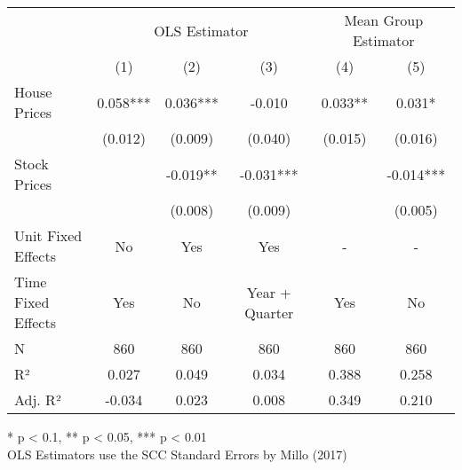 \begin{table}[h]
\fontsize{9.0pt}{10.8pt}\selectfont
\begin{tabular*}{\linewidth}{@{\extracolsep{\fill}}lccccc}
\toprule
 & \multicolumn{3}{c}{OLS Estimator} & \multicolumn{2}{c}{Mean Group Estimator} \\ 
\cmidrule(lr){2-4} \cmidrule(lr){5-6}
  & (1) & (2) & (3) & (4) & (5) \\ 
\midrule\addlinespace[2.5pt]
House Prices & 0.058*** & 0.036*** & -0.010 & 0.033** & 0.031* \\ 
 & (0.012) & (0.009) & (0.040) & (0.015) & (0.016) \\ 
Stock Prices &  & -0.019** & -0.031*** &  & -0.014*** \\ 
{} & {} & {(0.008)} & {(0.009)} & {} & {(0.005)} \\ 
\midrule
Unit Fixed Effects & No & Yes & Yes & - & - \\ 
Time Fixed Effects & Yes & No & Year + Quarter & Yes & No \\ 
\midrule
{N} & {860} & {860} & {860} & {860} & {860} \\ 
R² & 0.027 & 0.049 & 0.034 & 0.388 & 0.258 \\ 
Adj. R² & -0.034 & 0.023 & 0.008 & 0.349 & 0.210 \\ 
\bottomrule
\end{tabular*}
\begin{minipage}{\linewidth}
* p < 0.1, ** p < 0.05, *** p < 0.01\\
OLS Estimators use the SCC Standard Errors by Millo (2017)\\
\end{minipage}
\end{table}

